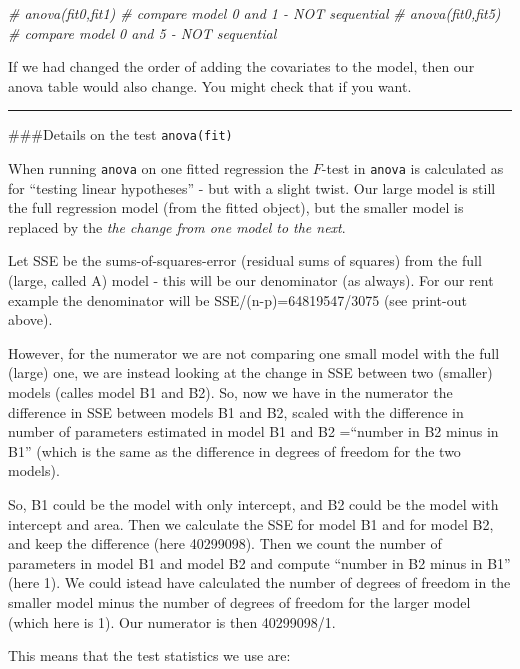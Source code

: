 \documentclass[
]{article}
\newenvironment{Shaded}{\begin{snugshade}}{\end{snugshade}}
\newcommand{\CommentTok}[1]{\textcolor[rgb]{0.56,0.35,0.01}{\textit{#1}}}
\begin{document}
\begin{Shaded}
\begin{Highlighting}[]
\CommentTok{\# anova(fit0,fit1) \# compare model 0 and 1 {-} NOT sequential}
\CommentTok{\# anova(fit0,fit5) \# compare model 0 and 5 {-} NOT sequential}
\end{Highlighting}
\end{Shaded}

If we had changed the order of adding the covariates to the model, then
our anova table would also change. You might check that if you want.

\begin{center}\rule{0.5\linewidth}{0.5pt}\end{center}

\#\#\#Details on the test \texttt{anova(fit)}

When running \texttt{anova} on one fitted regression the \(F\)-test in
\texttt{anova} is calculated as for ``testing linear hypotheses'' - but
with a slight twist. Our large model is still the full regression model
(from the fitted object), but the smaller model is replaced by the
\emph{the change from one model to the next}.

Let SSE be the sums-of-squares-error (residual sums of squares) from the
full (large, called A) model - this will be our denominator (as always).
For our rent example the denominator will be SSE/(n-p)=64819547/3075
(see print-out above).

However, for the numerator we are not comparing one small model with the
full (large) one, we are instead looking at the change in SSE between
two (smaller) models (calles model B1 and B2). So, now we have in the
numerator the difference in SSE between models B1 and B2, scaled with
the difference in number of parameters estimated in model B1 and B2
=``number in B2 minus in B1'' (which is the same as the difference in
degrees of freedom for the two models).

So, B1 could be the model with only intercept, and B2 could be the model
with intercept and area. Then we calculate the SSE for model B1 and for
model B2, and keep the difference (here 40299098). Then we count the
number of parameters in model B1 and model B2 and compute ``number in B2
minus in B1'' (here 1). We could istead have calculated the number of
degrees of freedom in the smaller model minus the number of degrees of
freedom for the larger model (which here is 1). Our numerator is then
40299098/1.

This means that the test statistics we use are:
\end{document}
